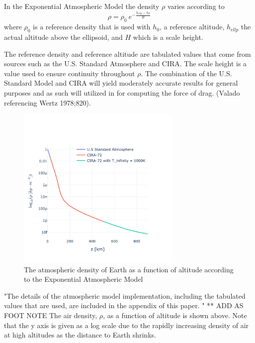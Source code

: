 \documentclass{article}
\begin{document}
In the Exponential Atmospheric Model the density $\rho$ varies according to
\begin{equation}
	\rho = \rho_0\:e^{-\frac{h_{ellp} - h_0}{H}}
\end{equation}
where $\rho_0$ is a reference density that is used with $h_0$,  a reference altitude,  $h_{ellp}$ the actual altitude above the ellipsoid, and $H$ which is a scale height.

The reference density and reference altitude are tabulated values that come from sources such as the U.S. Standard Atmosphere and CIRA. The scale height is a value used to ensure continuity throughout $\rho$. The combination of the U.S. Standard Model and CIRA will yield moderately accurate results for general purposes and as such will utilized in for computing the force of drag. (Valado referencing Wertz 1978;820).

\begin{figure}[H]
	\centering     %
	\vspace*{-1.5in}
	\includegraphics[width=0.7\textwidth]{Atmospheric_Density_v_Altitude}
	\caption{The atmospheric density of Earth as a function of altitude according to the Exponential Atmospheric Model}
\end{figure}

"The details of the atmospheric model implementation, including the tabulated values that are used, are included in the appendix of this paper. " ** ADD AS FOOT NOTE   The air density, $\rho$, as a function of altitude is shown above. Note that the y axis is given as a log scale due to the rapidly increasing density of air at high altitudes as the distance to Earth shrinks.
\end{document}
